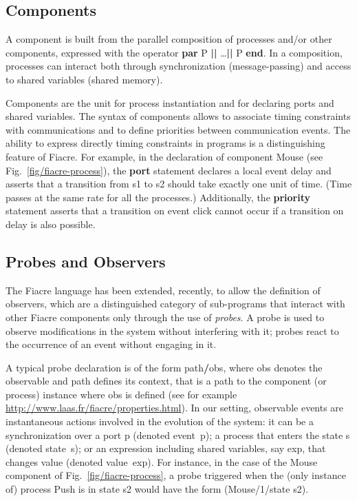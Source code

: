 \documentclass[a4paper]{scrartcl}
\def\code#1{\textsf{\small\bfseries #1}}
\def\vars#1{\textsf{\small #1}}
\begin{document}
\subsection{Components} A {component} is built from the parallel
composition of processes and/or other components, expressed with the
operator \code{par} \vars{P} \code{||} \dots \code{||}
\vars{P} \code{end}. In a composition, processes can interact both
through synchronization (message-passing) and access to shared
variables (shared memory).

Components are the unit for process instantiation and for declaring
ports and shared variables. The syntax of components allows to
associate timing constraints with communications and to define
priorities between communication events. The ability to express
directly timing constraints in programs is a distinguishing feature of
Fiacre. For example, in the declaration of component \vars{Mouse} (see
Fig.~\ref{fig/fiacre-process}), the \code{port} statement declares a
local event \vars{delay} and asserts that a transition from \vars{s1}
to \vars{s2} should take exactly one unit of time. (Time passes at the
same rate for all the processes.) Additionally, the \code{priority}
statement asserts that a transition on event \vars{click} cannot occur
if a transition on \vars{delay} is also possible.
 
\subsection{Probes and Observers} 
The Fiacre language has been extended, recently, to allow the
definition of {observers}, which are a distinguished category of
sub-programs that interact with other Fiacre components only through
the use of \emph{probes}. A probe is used to observe modifications in
the system without interfering with it; probes react to the occurrence
of an event without engaging in it.

A typical probe declaration is of the form
\vars{path}\code{/}\vars{obs}, where \vars{obs} denotes the observable
and \vars{path} defines its context, that is a path to the component
(or process) instance where \vars{obs} is defined (see for example
{\footnotesize\url{http://www.laas.fr/fiacre/properties.html}}).  In
our setting, observable events are instantaneous actions involved in
the evolution of the system: it can be a synchronization over a port
\vars{p} (denoted \vars{event~p}); a process that enters the state
\vars{s} (denoted \vars{state~s}); or an expression including shared
variables, say \vars{exp}, that changes value (denoted
\vars{value~exp}). For instance, in the case of the \vars{Mouse}
component of Fig.~\ref{fig/fiacre-process}, a probe triggered when the
(only instance of) process \vars{Push} is in state \vars{s2} would
have the form \vars{(Mouse/1/state s2)}. 
\end{document}
